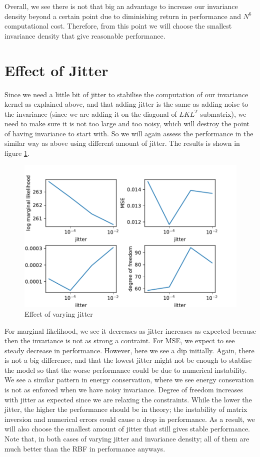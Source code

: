 \documentclass{statsmsc}
\begin{document}
Overall, we see there is not that big an advantage to increase our invariance density beyond a certain point due to diminishing return in performance and $N^6$ computational cost.
Therefore, from this point we will choose the smallest invariance density that give reasonable performance.  

\section{Effect of Jitter}
Since we need a little bit of jitter to stabilise the computation of our invariance kernel as explained above, and that adding jitter is the same as adding noise to the invariance (since we are adding it on the diagonal of $LKL^T$ submatrix), we need to make sure it is not too large and too noisy, which will destroy the point of having invariance to start with. 
So we will again assess the performance in the similar way as above using different amount of jitter.
The results is shown in figure \ref{fig:vary_jitter}.

\begin{figure}[H] 
  \includegraphics[width=\linewidth]{../codes/figures/vary_jitter.pdf}
  \centering
  \caption{Effect of varying jitter}
  \label{fig:vary_jitter}
\end{figure}

For marginal likelihood, we see it decreases as jitter increases as expected because then the invariance is not as strong a contraint.
For MSE, we expect to see steady decrease in performance.
However, here we see a dip initially.
Again, there is not a big difference, and that the lowest jitter might not be enough to stablise the model so that the worse performance could be due to numerical instability.
We see a similar pattern in energy conservation, where we see energy consevation is not as enforced when we have noisy invariance.
Degree of freedom increases with jitter as expected since we are relaxing the constraints.
While the lower the jitter, the higher the performance should be in theory; the instability of matrix inversion and numerical errors could cause a drop in performance.
As a result,  we will also choose the smallest amount of jitter that still gives stable performance.  
Note that, in both cases of varying jitter and invariance density; all of them are much better than the RBF in performance anyways.
\end{document}
